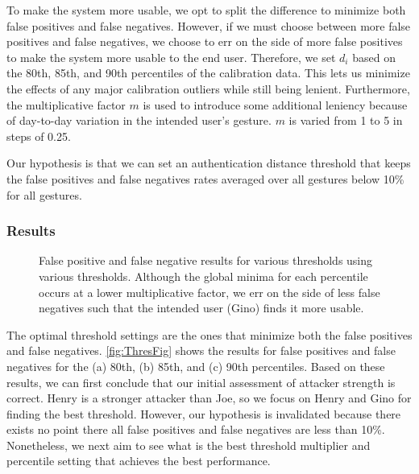 To make the system more usable, we opt to split the difference to minimize both false positives and false negatives. However, if we must choose between more false positives and false negatives, we choose to err on the side of more false positives to make the system more usable to the end user. Therefore, we set $d_{i}$ based on the 80th, 85th, and 90th percentiles of the calibration data. This lets us minimize the effects of any major calibration outliers while still being lenient. Furthermore, the multiplicative factor $m$ is used to introduce some additional leniency because of day-to-day variation in the intended user's gesture. $m$ is varied from 1 to 5 in steps of 0.25.

Our hypothesis is that we can set an authentication distance threshold that keeps the false positives and false negatives rates averaged over all gestures below 10\% for all gestures.

\subsubsection{Results}

 \begin{figure}[!t]
    	\centering
 	\subfloat[80th Percentile]{
 	\centering
 	\tikzthirds
		
 		 \label{fig:80p}}
 	\subfloat[85th Percentile]{
 	\centering
 	\tikzthirds
		
 		 \label{fig:85p}}
 	\subfloat[90th Percentile]{
 	\centering
 	\tikzthirds
		
 		 \label{fig:ThresFig}}
 	\caption{False positive and false negative results for various thresholds using various thresholds. Although the global minima for each percentile occurs at a lower multiplicative factor, we err on the side of less false negatives such that the intended user (Gino) finds it more usable.}
 \end{figure}
 
The optimal threshold settings are the ones that minimize both the false positives and false negatives. \autoref{fig:ThresFig} shows the results for false positives and false negatives for the (a) 80th, (b) 85th, and (c) 90th percentiles. Based on these results, we can first conclude that our initial assessment of attacker strength is correct. Henry is a stronger attacker than Joe, so we focus on Henry and Gino for finding the best threshold. However, our hypothesis is invalidated because there exists no point there all false positives and false negatives are less than 10\%. Nonetheless, we next aim to see what is the best threshold multiplier and percentile setting that achieves the best performance. 

